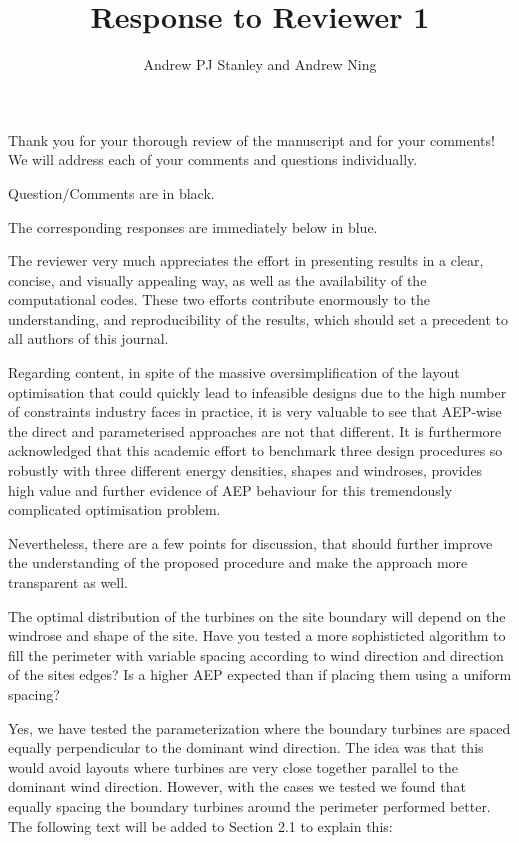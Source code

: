 \documentclass[12pt]{report}
\title{Response to Reviewer 1}
\begin{document}
\author{Andrew PJ Stanley and Andrew Ning}

\maketitle

Thank you for your thorough review of the manuscript and for your comments! We will address each of your comments and questions individually.

\bigskip
Question/Comments are in black.

\color{blue} The corresponding responses are immediately below in blue.

\bigskip


\color{black}

The reviewer very much appreciates the effort in presenting results in a clear, concise, and visually appealing way, as well as the availability of the computational codes. These two efforts contribute enormously to the understanding, and reproducibility of the results, which should set a precedent to all authors of this journal. 

Regarding content, in spite of the massive oversimplification of the layout optimisation that could quickly lead to infeasible designs due to the high number of constraints industry faces in practice, it is very valuable to see that AEP-wise the direct and parameterised approaches are not that different. It is furthermore acknowledged that this academic effort to benchmark three design procedures so robustly with three different energy densities, shapes and windroses, provides high value and further evidence of AEP behaviour for this tremendously complicated optimisation problem. 

Nevertheless, there are a few points for discussion, that should further improve the understanding of the proposed procedure and make the approach more transparent as well. 

\bigskip

The optimal distribution of the turbines on the site boundary will depend on the windrose and shape of the site. Have you tested a more sophisticted algorithm to fill the perimeter with variable spacing according to wind direction and direction of the sites edges? Is a higher AEP expected than if placing them using a uniform spacing? 

\bigskip
\color{blue}

Yes, we have tested the parameterization where the boundary turbines are spaced equally perpendicular to the dominant wind direction. The idea was that this would avoid layouts where turbines are very close together parallel to the dominant wind direction. However, with the cases we tested we found that equally spacing the boundary turbines around the perimeter performed better. The following text will be added to Section 2.1 to explain this:
\end{document}
